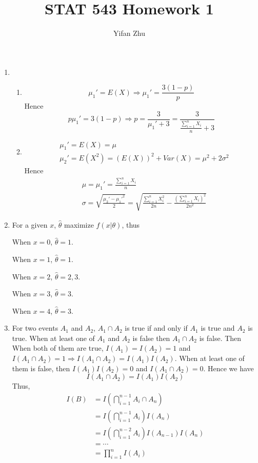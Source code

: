 \documentclass{article}
\begin{document}
	

	
	\title{STAT 543 Homework 1}
	\author{Yifan Zhu}
	\maketitle
	
	\begin{enumerate}[leftmargin = 0 em, label = \arabic*., font = \bfseries]
	\item 
	\begin{enumerate}
		\item 
		\[\mu_1' = E(X) \Rightarrow \mu_1 ' = \frac{3(1 - p)}{p}\]
		Hence
		\[p \mu_1 ' = 3(1 - p) \Rightarrow p = \frac{3}{\mu_1 ' + 3} = \frac{3}{\frac{\sum_{i=1}^n X_i}{n} + 3}\]

		\item 
		\begin{align*}
		& \mu_1 '  = E(X) = \mu\\
		& \mu_2' = E(X^2) = (E(X))^2 + Var(X) = \mu^2 + 2 \sigma^2
		\end{align*}
		Hence
		\begin{align*}
		& \mu = \mu_1' = \frac{\sum_{i=1}^n X_i}{n}\\
		& \sigma = \sqrt{\frac{\mu_2' - \mu_1'^2}{2}} = \sqrt{\frac{\sum_{i=1}^n X_i^2}{2n} - \frac{(\sum_{i=1}^n X_i)^2}{2 n^2}}
		\end{align*}
		
		
	\end{enumerate}

	\item 
	For a given $x$, $\hat{\theta}$ maximize $f(x|\theta)$, thus

	When $x = 0$, $\hat{\theta} = 1$.

	When $x = 1$, $\hat{\theta} = 1$.

	When $x = 2$, $\hat{\theta} = 2,3$.

	When $x = 3$, $\hat{\theta} = 3$.

	When $x = 4$, $\hat{\theta} = 3$.


	\item 
	For two events $A_1$ and $A_2$, $A_1 \cap A_2$ is true if and only if $A_1$ is true and $A_2$ is true. When at least one of $A_1$ and $A_2$ is false then $A_1 \cap A_2$ is false. Then When both of them are true, $I(A_1) = I(A_2) = 1 $ and $I(A_1 \cap A_2) = 1 \Rightarrow I(A_1 \cap A_2) = I(A_1) I(A_2)$. When at least one of them is false, then $I(A_1) I(A_2) = 0$ and $I(A_1 \cap A_2) = 0$. Hence we have 
	\[I(A_1 \cap A_2) = I(A_1) I(A_2)\]
	Thus,
	\begin{align*}
	I(B) & = I(\bigcap_{i=1}^{n-1} A_i \cap A_n)\\
	& = I(\bigcap_{i=1}^{n-1} A_i) I(A_n)\\
	& = I(\bigcap_{i=1}^{n-2} A_i) I(A_{n-1})I(A_{n})\\
	& = \cdots\\
	& = \prod_{i=1}^n I(A_i)
	\end{align*}
	

\end{enumerate}
\end{document}

